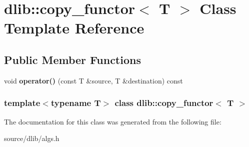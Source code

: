 \hypertarget{classdlib_1_1copy__functor}{
\section{dlib::copy\_\-functor$<$ T $>$ Class Template Reference}
\label{classdlib_1_1copy__functor}
}
\subsection*{Public Member Functions}
\begin{DoxyCompactItemize}
\item 
\hypertarget{classdlib_1_1copy__functor_a508324ae27d9d1675714f3f95e93b2ec}{
void {\bfseries operator()} (const T \&source, T \&destination) const }
\label{classdlib_1_1copy__functor_a508324ae27d9d1675714f3f95e93b2ec}

\end{DoxyCompactItemize}
\subsubsection*{template$<$typename T$>$ class dlib::copy\_\-functor$<$ T $>$}



The documentation for this class was generated from the following file:\begin{DoxyCompactItemize}
\item 
source/dlib/algs.h\end{DoxyCompactItemize}
